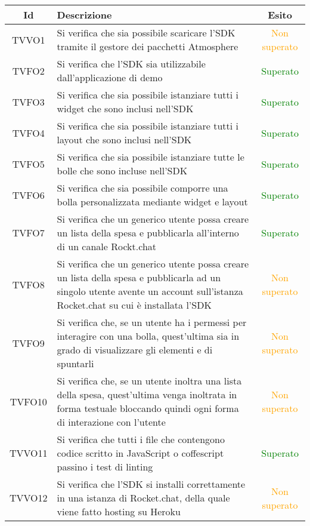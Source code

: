 \begin{center}
	\begin{longtable}{|c|>{\centering}m{10cm}|c|}\hline
		Id & Descrizione & Esito\\ \hline
		TVVO1 & Si verifica che sia possibile scaricare l'SDK tramite il gestore dei pacchetti Atmosphere & \textcolor{Orange}{Non superato}\\ \hline
		TVFO2 & Si verifica che l'SDK sia utilizzabile dall'applicazione di demo & \textcolor{Green}{Superato}\\ \hline
		TVFO3 & Si verifica che sia possibile istanziare tutti i widget che sono inclusi nell'SDK & \textcolor{Green}{Superato}\\ \hline
		TVFO4 & Si verifica che sia possibile istanziare tutti i layout che sono inclusi nell'SDK & \textcolor{Green}{Superato}\\ \hline
		TVFO5 & Si verifica che sia possibile istanziare tutte le bolle che sono incluse nell'SDK & \textcolor{Green}{Superato}\\ \hline
		TVFO6 & Si verifica che sia possibile comporre una bolla personalizzata mediante widget e layout & \textcolor{Green}{Superato}\\ \hline
		TVFO7 & Si verifica che un generico utente possa creare un lista della spesa e pubblicarla all'interno di un canale Rockt.chat & \textcolor{Green}{Superato}\\ \hline
		TVFO8 & Si verifica che un generico utente possa creare un lista della spesa e pubblicarla ad un singolo utente avente un account sull'istanza Rocket.chat su cui è installata l'SDK & \textcolor{Orange}{Non superato}\\ \hline
		TVFO9 & Si verifica che, se un utente ha i permessi per interagire con una bolla, quest'ultima sia in grado di visualizzare gli elementi e di spuntarli & \textcolor{Orange}{Non superato}\\ \hline
		TVFO10 & Si verifica che, se un utente inoltra una lista della spesa, quest'ultima venga inoltrata in forma testuale bloccando quindi ogni forma di interazione con l'utente & \textcolor{Orange}{Non superato}\\ \hline
		TVVO11 & Si verifica che tutti i file che contengono codice scritto in JavaScript o coffescript passino i test di linting & \textcolor{Green}{Superato}\\ \hline
		TVVO12 & Si verifica che l'SDK si installi correttamente in una istanza di Rocket.chat, della quale viene fatto hosting su Heroku & \textcolor{Orange}{Non superato}\\ \hline

\end{longtable}
\end{center}
